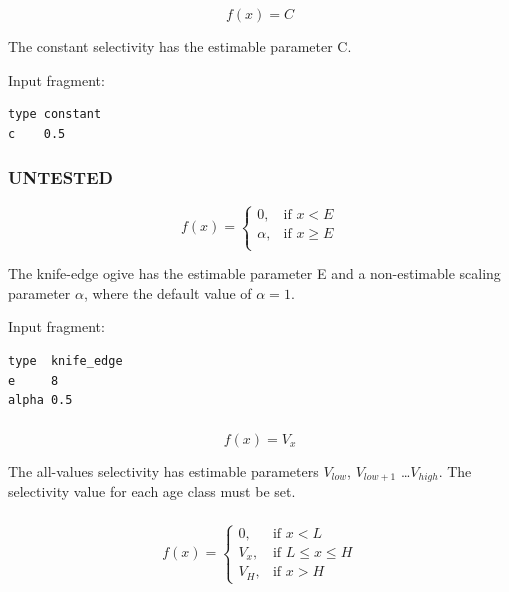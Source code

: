 \begin{equation}
f(x)=C
\end{equation}

The constant selectivity has the estimable parameter C.

Input fragment: {\small{\begin{verbatim}
type constant
c    0.5
\end{verbatim}}}

\subsubsection[Knife-edge]{ UNTESTED}

\begin{equation}
f(x)= \begin{cases}
  0, & \text{if $x < E$} \\
  \alpha, & \text{if $x \ge E$}\\
  \end{cases}
\end{equation}

The knife-edge ogive has the estimable parameter E and a non-estimable scaling parameter $\alpha$, where the default value of $\alpha = 1$.

Input fragment: {\small{\begin{verbatim}
type  knife_edge
e     8
alpha 0.5
\end{verbatim}}}

\subsubsection[All-values]{}

\begin{equation}
f(x)=V_x
\end{equation}

The all-values selectivity has estimable parameters $V_{low}$, $V_{low+1}$ \ldots $V_{high}$. The selectivity value for each age class must be set.

\subsubsection[All-values-bounded]{}

\begin{equation}
f(x)=\begin{cases}
		 0, & \text{if $x < L$} \\
		 V_x, & \text{if $L \le x \le H$} \\
		 V_H, & \text{if $x > H$}
  \end{cases}
\end{equation}

